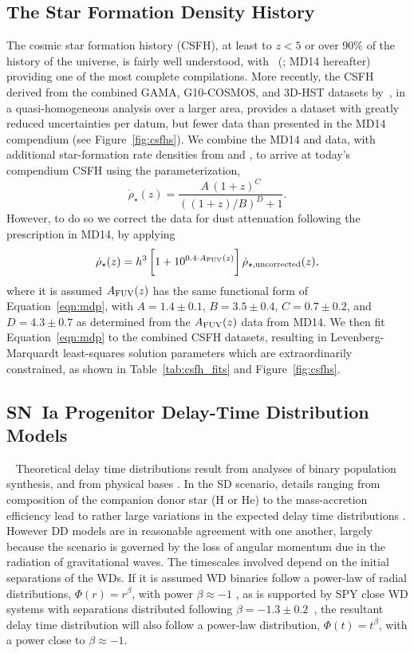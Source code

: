 \documentclass[apj]{aastex62}
\begin{document}
\subsection{The Star Formation Density History}\label{sec:csfh}
The cosmic star formation history (CSFH), at least to $z < 5$ or over 90\% of the history of the universe, is fairly well understood, with~\citeauthor{Madau:2014fk} (\citeyear{Madau:2014fk}; MD14 hereafter) providing one of the most complete compilations. More recently, the CSFH derived from the combined GAMA, G10-COSMOS, and 3D-HST datasets by~\cite{Driver:2018nr}, in a quasi-homogeneous analysis over a larger area, provides a dataset with greatly reduced uncertainties per datum, but fewer data than presented in the MD14 compendium (see Figure~\ref{fig:csfhs}).  We combine the MD14 and \cite{Driver:2018nr} data, with additional star-formation rate densities from \cite{Bouwens:2015qy} and \cite{Khusanova:2019kx}, to arrive at today's compendium CSFH using the parameterization,
\begin{equation}
\dot{\rho}_{\star}(z) = \frac{A\,(1+z)^C}{((1+z)/B)^D+1}.\label{eqn:mdp}
\end{equation}
However, to do so we correct the \cite{Driver:2018nr} data for dust attenuation following the prescription in MD14, by applying 
\begin{equation}
	\dot{\rho}_{\star}(z) =h^3\,\biggl[1+10^{0.4\cdot A_{\rm FUV}(z)}\biggr]\, \dot{\rho}_{\star, {\rm uncorrected}}(z),
\end{equation}
\noindent where it is assumed $A_{\rm FUV}(z)$ has the same functional form of Equation~\ref{eqn:mdp}, with $A=1.4\pm0.1$, $B=3.5\pm0.4$, $C=0.7\pm0.2$, and $D=4.3\pm0.7$ as determined from the $A_{\rm FUV}(z)$ data from MD14. We then fit Equation~\ref{eqn:mdp} to the combined CSFH datasets, resulting in Levenberg-Marquardt least-squares solution parameters which are extraordinarily constrained, as shown in Table~\ref{tab:csfh_fits} and Figure~\ref{fig:csfhs}. 


\subsection{SN~Ia Progenitor Delay-Time Distribution Models}~\label{sec:dtd}
Theoretical delay time distributions result from analyses of binary population synthesis, and from physical bases \cite[see][ for a review]{Wang:2012a}.  In the SD scenario, details ranging from composition of the companion donor star (H or He) to the mass-accretion efficiency lead to rather large variations in the expected delay time distributions \cite{Nelemans:2013}. However DD models are in reasonable agreement with one another, largely because the scenario is governed by the loss of angular momentum due in the radiation of gravitational waves. The timescales involved depend on the  initial separations of the WDs. If it is assumed WD binaries follow a power-law of radial distributions, $\Phi(r)=r^{\beta}$, with power $\beta\approx-1$ \citep{Opik:1924xr}, as is supported by  SPY close WD systems with separations distributed following $\beta=-1.3\pm0.2$~\citep{Maoz:2017zl}, the resultant delay time distribution will also follow a power-law distribution, $\Phi(t)=t^{\beta}$, with a power close to $\beta\approx-1$.
\end{document}
